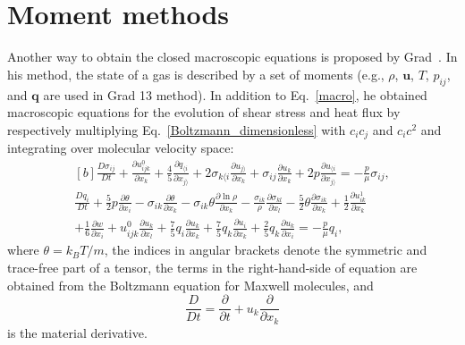 \section{Moment methods}




Another way to obtain the closed macroscopic equations is proposed by Grad~\cite{Grad1949}. In his method, the state of a gas is described by a set of moments (e.g., $\rho$, $\bm{u}$, $T$, $p_{ij}$, and $\bm{q}$ are used in Grad 13 method). In addition to Eq.~\eqref{macro}, he obtained macroscopic equations for the evolution of shear stress and heat flux by respectively multiplying Eq.~\eqref{Boltzmann_dimensionless} with $c_ic_j$ and $c_ic^2$ and integrating over molecular velocity space:
\begin{equation}
\begin{aligned}[b]
\frac{D\sigma_{ij}}{Dt}+ \frac{\partial u^0_{ijk}}{\partial x_k} +\frac{4}{5}\frac{\partial q_{\langle i}}{\partial x_{j\rangle}}
+2\sigma_{k\langle i}\frac{\partial u_{j\rangle}}{\partial x_k} +\sigma_{ij}\frac{\partial u_k}{\partial x_k}+2p\frac{\partial u_{\langle i}}{\partial x_{j\rangle}}=-\frac{p}{\mu}\sigma_{ij}, \\
\frac{Dq_{i}}{Dt}+\frac{5}{2}p\frac{\partial \theta}{\partial x_i} -\sigma_{ik}\frac{\partial\theta}{\partial x_k} -\sigma_{ik}\theta\frac{\partial\ln\rho}{\partial x_k}
-\frac{\sigma_{ik}}{\rho}\frac{\partial\sigma_{kl}}{\partial x_l}
-\frac{5}{2}\theta\frac{\partial\sigma_{ik}}{\partial x_k}
+\frac{1}{2}\frac{\partial u^{1}_{ik}}{\partial x_k}\\
+\frac{1}{6}\frac{\partial w}{\partial x_i}
+u^0_{ijk}\frac{\partial u_k}{\partial x_l}
+\frac{7}{5}q_i\frac{\partial u_k}{\partial x_k}
+\frac{7}{5}q_k\frac{\partial u_i}{\partial x_k}
+\frac{2}{5}q_k\frac{\partial u_k}{\partial x_i}
=-\frac{p}{\mu}q_i,
\end{aligned}
\end{equation}
where $\theta=k_BT/m$, the indices in angular brackets denote the symmetric and trace-free part of a tensor, the terms in the right-hand-side of equation are obtained from the Boltzmann equation for Maxwell molecules, and
\begin{equation}
\frac{D}{Dt}=\frac{\partial}{\partial t}+u_k\frac{\partial }{\partial x_k}
\end{equation}
is the material derivative.


